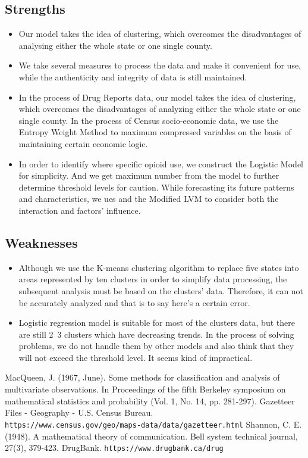 \documentclass[12pt]{article}
\begin{document}
\subsection{Strengths}
\begin{itemize}
    \item Our model takes the idea of clustering, which overcomes the disadvantages of analysing either the whole state or one single county.
    \item We take several measures to process the data and make it convenient for use, while the authenticity and integrity of data is still maintained.
    \item In the process of Drug Reports data, our model takes the idea of clustering, which overcomes the disadvantages of analyzing either the whole state or one single county. In the process of Census socio-economic data, we use the Entropy Weight Method to maximum compressed variables on the basis of maintaining certain economic logic.
	\item In order to identify where specific opioid use, we construct the Logistic Model for simplicity. And we get maximum number from the model to further determine threshold levels for caution. While forecasting its future patterns and characteristics, we ues and the Modified LVM to consider both the interaction and factors’ influence.
\end{itemize}

\subsection{Weaknesses}
\begin{itemize}
	\item Although we use the K-means clustering algorithm to replace five states into areas represented by ten clusters in order to simplify data processing, the subsequent analysis must be based on the clusters’ data. Therefore, it can not be accurately analyzed and that is to say here’s a certain error.
	\item Logistic regression model is suitable for most of the clusters data, but there are still 2~3 clusters which have decreasing trends. In the process of solving problems, we do not handle them by other models and also think that they will not exceed the threshold level. It seems kind of impractical.
 \end{itemize}

\begin{thebibliography}{99}
MacQueen, J. (1967, June). Some methods for classification and analysis of multivariate observations. In Proceedings of the fifth Berkeley symposium on mathematical statistics and probability (Vol. 1, No. 14, pp. 281-297).
Gazetteer Files - Geography - U.S. Census Bureau. \texttt{\\https://www.census.gov/geo/maps-data/data/gazetteer.html}
Shannon, C. E. (1948). A mathematical theory of communication. Bell system technical journal, 27(3), 379-423.
DrugBank. \texttt{https://www.drugbank.ca/drug}
\end{thebibliography}
\end{document}
